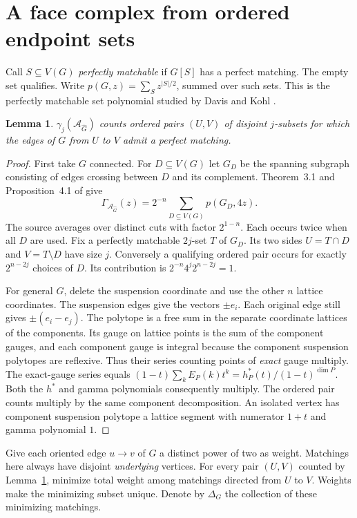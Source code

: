 \documentclass[11pt]{article}
\newtheorem{lemma}[theorem]{Lemma}
\newcommand{\G}{\Gamma}
\newcommand{\A}{\mathcal A}
\begin{document}
\section{A face complex from ordered endpoint sets}
Call $S\subseteq V(G)$ \emph{perfectly matchable} if $G[S]$ has a perfect matching. The empty set qualifies. Write $p(G,z)=\sum_{S}z^{|S|/2}$, summed over such sets. This is the perfectly matchable set polynomial studied by Davis and Kohl \cite{DK}.

\begin{lemma}\label{cut}
$\gamma_j(\A_{\widehat G})$ counts ordered pairs $(U,V)$ of disjoint $j$-subsets for which the edges of $G$ from $U$ to $V$ admit a perfect matching.
\end{lemma}
\begin{proof}
First take $G$ connected. For $D\subseteq V(G)$ let $G_D$ be the spanning subgraph consisting of edges crossing between $D$ and its complement. Theorem~3.1 and Proposition~4.1 of \cite{OT} give
\[
 \G_{\A_{\widehat G}}(z)=2^{-n}\sum_{D\subseteq V(G)}p(G_D,4z).
\]
The source averages over distinct cuts with factor $2^{1-n}$. Each occurs twice when all $D$ are used. Fix a perfectly matchable $2j$-set $T$ of $G_D$. Its two sides $U=T\cap D$ and $V=T\setminus D$ have size $j$. Conversely a qualifying ordered pair occurs for exactly $2^{n-2j}$ choices of $D$. Its contribution is $2^{-n}4^j2^{n-2j}=1$.

For general $G$, delete the suspension coordinate and use the other $n$ lattice coordinates. The suspension edges give the vectors $\pm e_i$. Each original edge still gives $\pm(e_i-e_j)$. The polytope is a free sum in the separate coordinate lattices of the components. Its gauge on lattice points is the sum of the component gauges, and each component gauge is integral because the component suspension polytopes are reflexive. Thus their series counting points of \emph{exact} gauge multiply. The exact-gauge series equals $(1-t)\sum_kE_P(k)t^k=h_P^*(t)/(1-t)^{\dim P}$. Both the $h^*$ and gamma polynomials consequently multiply. The ordered pair counts multiply by the same component decomposition. An isolated vertex has component suspension polytope a lattice segment with numerator $1+t$ and gamma polynomial $1$.
\end{proof}

Give each oriented edge $u\to v$ of $G$ a distinct power of two as weight. Matchings here always have disjoint \emph{underlying} vertices. For every pair $(U,V)$ counted by Lemma~\ref{cut}, minimize total weight among matchings directed from $U$ to $V$. Weights make the minimizing subset unique. Denote by $\Delta_G$ the collection of these minimizing matchings.
\end{document}
